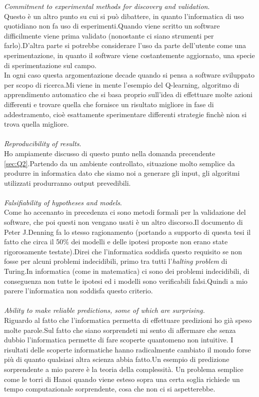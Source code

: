 \documentclass[a4paper]{article}
\begin{document}
\emph{Commitment to experimental methods for discovery and validation}.\\Questo è un altro punto su cui si può dibattere, in quanto l'informatica di uso quotidiano non fa uso di esperimenti.Quando viene scritto un software difficilmente viene prima validato (nonostante ci siano strumenti per farlo).D'altra parte si potrebbe considerare l'uso da parte dell'utente come una sperimentazione, in quanto il software viene costantemente aggiornato, una specie di sperimentazione sul campo.\\In ogni caso questa argomentazione decade quando si pensa a software sviluppato per scopo di ricerca.Mi viene in mente l'esempio del Q-learning, algoritmo di apprendimento automatico che si basa proprio sull'idea di effettuare molte azioni differenti e trovare quella che fornisce un risultato migliore in fase di addestramento, cioè esattamente sperimentare differenti strategie finchè nion si trova quella migliore.\\\\

\emph{Reproducibility of results}.\\Ho ampiamente discusso di questo punto nella domanda precendente \ref{sec:Q2}.Partendo da un ambiente controllato, situazione molto semplice da produrre in informatica dato che siamo noi a generare gli input, gli algoritmi utilizzati produrranno output prevedibili.\\\\

\emph{Falsifiability of hypotheses and models}.\\Come ho accenanto in precedenza ci sono metodi formali per la validazione del software, che poi questi non vengano usati è un altro discorso.Il documento di Peter J.Denning fa lo stesso ragionamento (portando a supporto di questa tesi il fatto che circa il 50\% dei modelli e delle ipotesi proposte non erano state rigorosamente testate).Direi che l'informatica soddisfa questo requisito se non fosse per alcuni problemi indecidibili, primo tra tutti l'\emph{halting problem} di Turing.In informatica (come in matematica) ci sono dei problemi indecidibili, di conseguenza non tutte le ipotesi ed i modelli sono verificabili falsi.Quindi a mio parere l'informatica non soddisfa questo criterio.\\\\

\emph{Ability to make reliable predictions, some of which are surprising.}\\Riguardo al fatto che l'informatica permetta di effettuare predizioni ho già speso molte parole.Sul fatto che siano sorprendeti mi sento di affermare che senza dubbio l'informatica permette di fare scoperte quantomeno non intuitive.
I risultati delle scoperte informatiche hanno radicalmente cambiato il mondo forse più di quanto qualsiasi altra scienza abbia fatto.Un esempio di predizione sorprendente a mio parere è la teoria della complessità. Un problema semplice come le torri di Hanoi quando viene esteso sopra una certa soglia richiede un tempo computazionale sorprendente, cosa che non ci si aspetterebbe.
\end{document}

